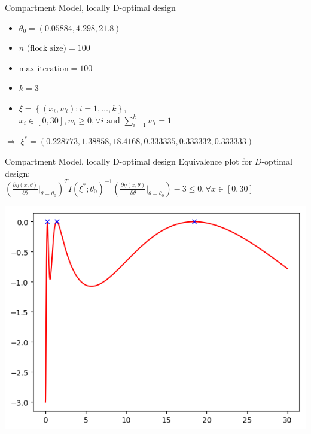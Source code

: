\documentclass{beamer}
\begin{document}
\begin{frame}{Compartment Model, locally D-optimal design}
  \begin{itemize}
    \item $\theta_0 = (0.05884, 4.298, 21.8)$
    \item $n\text{ (flock size)}=100$
    \item $\text{max iteration} = 100$
    \item $k=3$
    \item $\xi = \left\{ (x_i,w_i) : i=1,\ldots,k \right\},$\\
    $x_i \in [0,30], w_i \geq 0, \forall i \text{ and } \sum_{i=1}^k w_i = 1$
  \end{itemize}
  \vspace{3mm}
  $\Rightarrow$ $\xi^*=(0.228773, 1.38858, 18.4168, 0.333335, 0.333332, 0.333333)$
\end{frame}

\begin{frame}{Compartment Model, locally D-optimal design}
  Equivalence plot for $D$-optimal design:\\
  \vspace{3mm}
  $\left(\frac{\partial \eta(x;\theta)}{\partial\theta}\Big|_{\theta=\theta_0}\right)^T I(\xi^*;\theta_0)^{-1} \left(\frac{\partial \eta(x;\theta)}{\partial\theta}\Big|_{\theta=\theta_0}\right) - 3 \leq 0 , \forall x \in [0,30]$
  \begin{center}
    \includegraphics[scale=0.5]{equivplot.png}
  \end{center}
\end{frame}
\end{document}
